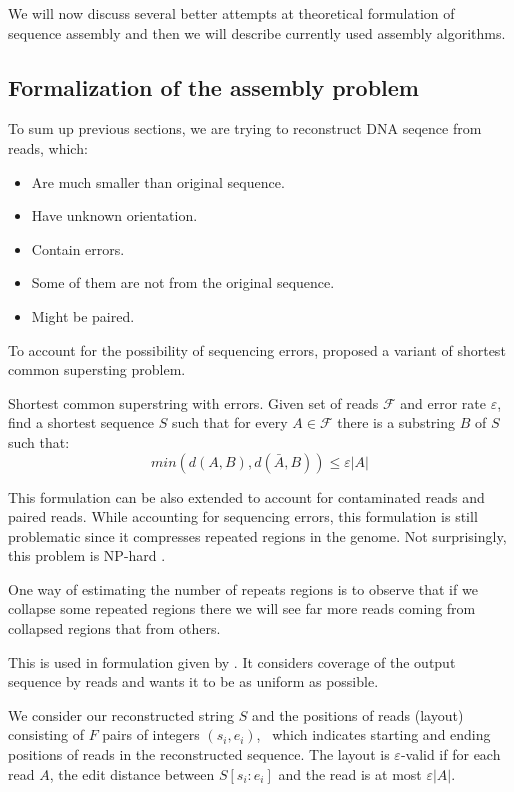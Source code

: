 We will now discuss several better attempts at theoretical
formulation of sequence assembly and then we will describe currently
used assembly algorithms.

\subsection{Formalization of the assembly problem}

To sum up previous sections, we are trying to reconstruct DNA seqence from reads,
which:
\begin{itemize}
\itemsep-0.2pt
\item Are much smaller than original sequence.
\item Have unknown orientation.
\item Contain errors.
\item Some of them are not from the original sequence.
\item Might be paired. 
\end{itemize}

\bigskip

To account for the possibility of sequencing errors, 
\citet{kececioglu1995combinatorial}
proposed a variant of shortest common supersting problem. 

\begin{definition}{Shortest common superstring with errors.}
Given set of reads $\mathcal{F}$ and error rate $\varepsilon$, find
a shortest sequence $S$ such that for every $A \in \mathcal{F}$ there is a substring
$B$ of $S$ such that:
$$min(d(A,B), d(\bar{A}, B)) \leq \varepsilon |A|$$
\end{definition}

This formulation can be also extended to account for contaminated reads and paired reads.
While accounting for sequencing errors, this formulation is still problematic
since it compresses repeated regions in the genome.
Not surprisingly, this problem is NP-hard \citep{kececioglu1991exact}.

\bigskip

One way of estimating the number of repeats regions is to observe
that if we collapse some repeated regions there we will see far
more reads coming from collapsed regions that from others. 

This is used in formulation given by \citet{myers1995toward}. It considers
coverage of the output sequence by reads and wants it to be as uniform as possible.

We consider our reconstructed string $S$ and the positions of reads (layout)
consisting of $F$ pairs of integers $(s_i, e_i)$,
\ which indicates starting and ending positions
of reads in the reconstructed sequence. The layout is $\varepsilon$-valid
if for each read $A$, the edit distance between $S[s_i:e_i]$ and the read
is at most $\varepsilon |A|$.

